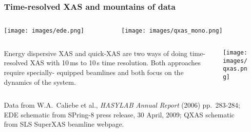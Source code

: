 \documentclass[10pt, xcolor=x11names, compress]{beamer}
\begin{document}
\begin{frame}
  \frametitle{Time-resolved XAS and mountains of data}

  \begin{columns}[T]
    \begin{column}{0.55\linewidth}
      \texttt{[image: images/ede.png]}
    \end{column}
    \begin{column}{0.42\linewidth}
      \texttt{[image: images/qxas\_mono.png]}
    \end{column}
  \end{columns}

  \begin{columns}
    \begin{column}{0.5\linewidth}
      \begin{overlayarea}{\linewidth}{24ex}
        Energy dispersive XAS and quick-XAS are two ways of doing
        time-resolved XAS with 10\,ms to 10\,s time resolution.  Both
        approaches require specially- equipped beamlines and both
        focus on the dynamics of the system. 
      \end{overlayarea}
    \end{column}
    \begin{column}{0.5\linewidth}
      \texttt{[image: images/qxas.png]}
    \end{column}
  \end{columns}

  \begin{bottomnote}[0.7][19.5]
    Data from W.A.\ Caliebe et al., \textit{HASYLAB Annual Report}
    (2006) pp.\ 283-284; EDE schematic from SPring-8 press release, 30
    April, 2009; QXAS schematic from SLS SuperXAS beamline webpage.
  \end{bottomnote}
\end{frame}
\end{document}
